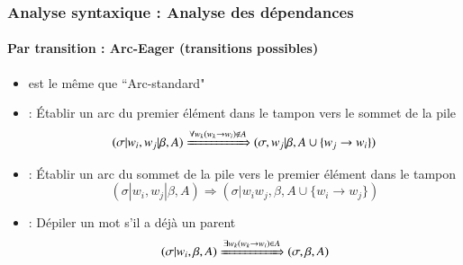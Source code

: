 \documentclass[xcolor=table]{beamer}
\begin{document}
\begin{frame}
\end{frame}


\begin{frame}
\frametitle{Analyse syntaxique : Analyse des dépendances}
\framesubtitle{Par transition : Arc-Eager (transitions possibles)}

\begin{itemize}
	\item {} est le même que ``Arc-standard"
	
	\item {} : Établir un arc du premier élément dans le tampon vers le sommet de la pile
	\[ (\sigma|w_i, w_j|\beta, A) \xRightarrow{\forall w_k (w_k \rightarrow w_i) \notin A}  (\sigma, w_j|\beta, A \cup \{w_j \rightarrow w_i \}) \] 
	
	\item {} : Établir un arc du sommet de la pile vers le premier élément dans le tampon
	\[ (\sigma|w_i, w_j|\beta, A) \Rightarrow  (\sigma|w_i w_j, \beta, A \cup \{w_i \rightarrow w_j \}) \] 
	
	\item {} : Dépiler un mot s'il a déjà un parent
	\[ (\sigma|w_i, \beta, A) \xRightarrow{\exists w_k (w_k \rightarrow w_i) \in A} (\sigma, \beta, A) \] 
\end{itemize}

\end{frame}
\end{document}
